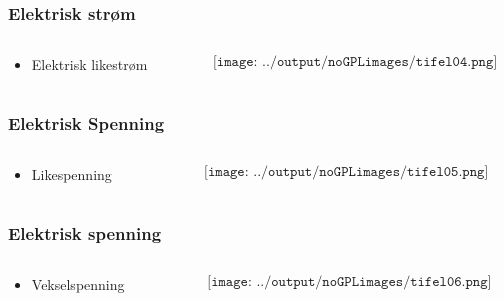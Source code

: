 \documentclass[aspectratio=169,xcolor=dvipsnames]{beamer}
\begin{document}
\begin{frame}
	\frametitle{Elektrisk strøm}

	\begin{columns}
		\begin{column}{0.5\textwidth}
			\begin{itemize}
				\item Elektrisk likestrøm
			\end{itemize}
		\end{column}

		\begin{column}{0.5\textwidth}
			$$\texttt{[image: ../output/noGPLimages/tifel04.png]}$$
		\end{column}
	\end{columns}
\end{frame}

\begin{frame}
	\frametitle{Elektrisk Spenning}

	\begin{columns}
		\begin{column}{0.5\textwidth}
			\begin{itemize}
				\item Likespenning
			\end{itemize}
		\end{column}

		\begin{column}{0.5\textwidth}
			$$\texttt{[image: ../output/noGPLimages/tifel05.png]}$$
		\end{column}
	\end{columns}
\end{frame}

\begin{frame}
	\frametitle{Elektrisk spenning}

	\begin{columns}
		\begin{column}{0.5\textwidth}
			\begin{itemize}
				\item Vekselspenning
			\end{itemize}
		\end{column}

		\begin{column}{0.5\textwidth}
			$$\texttt{[image: ../output/noGPLimages/tifel06.png]}$$
		\end{column}
	\end{columns}
\end{frame}
\end{document}
